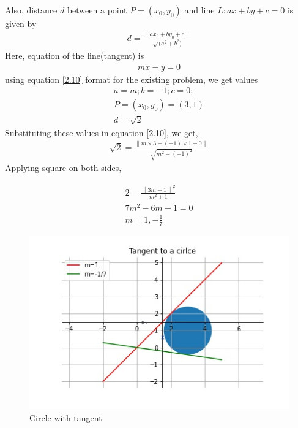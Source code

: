 \documentclass[journal,12pt,twocolumn]{IEEEtran}
\newcommand{\norm}[1]{\left\lVert#1\right\rVert}
\begin{document}
Also, distance $d$  between a point $P = (x_0, y_0)$ and line $ L: ax + by + c = 0$ is given by
\begin{align}
d = \frac{\norm{ax_0 + by_0 + c}}{\sqrt(a^2 + b^2)} \label{2.10}
\end{align}
Here, equation of the line(tangent) is
\begin{align}
mx-y = 0  \label{2.11}
\end{align}
using equation \ref{2.10}  format for the existing problem,  we get values
\begin{align}
a = m; b = -1; c=0;\\
P = (x_0,y_0) = (3,1)\\
d = \sqrt{2}
\end{align}
Substituting these values in equation  \ref{2.10}, we get,
\begin{align}
\sqrt{2} = \frac{\norm{m \times 3 + (-1) \times 1 + 0}}{\sqrt{m^2 + (-1)^2}}
\end{align}
Applying square on both sides,

\begin{align}
2 = \frac{\norm{3m-1}^2}{m^2 +1}\\
7m^2 -6m -1 =0\\
m=1 , -\frac{1}{7}
\end{align}
\begin{figure}[!]
\includegraphics[width=1\columnwidth]{tangent.jpg}
\caption{Circle with tangent}
\end{figure}
\end{document}
